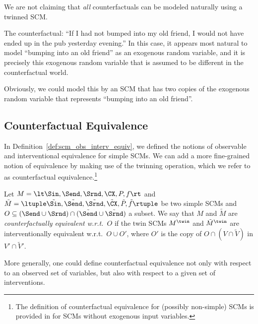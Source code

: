 We are not claiming that \emph{all} counterfactuals can be modeled naturally using a twinned SCM.
\begin{Eg}
The counterfactual: ``If I had not bumped into my old friend, I would not have ended up in the pub yesterday evening.''
In this case, it appears most natural to model ``bumping into an old friend'' as an exogenous random variable,
and it is precisely this exogenous random variable that is assumed to be different in the counterfactual world.
\end{Eg}
Obviously, we could model this by an SCM that has two copies of the exogenous random variable that represents
``bumping into an old friend''.

\subsection{Counterfactual Equivalence}

In Definition~\ref{def:scm_obs_interv_equiv}, we defined the notions of observable and interventional equivalence for simple SCMs. 
We can add a more fine-grained notion of equivalence by making use of the twinning operation, which we refer to as counterfactual equivalence.\footnote{The definition of counterfactual equivalence for (possibly non-simple) SCMs is provided in \cite{BFPM21} for SCMs without exogenous input variables.}
\begin{Def}\label{def:scm_counterfactual_equiv}
  Let $M = \lt \Sin, \Send, \Srnd, \CX, P, f \rt$ and
  $\tilde{M} = \ltuple \tilde{\Sin}, \tilde{\Send}, \tilde{\Srnd}, \tilde{\CX}, \tilde{P}, \tilde{f} \rtuple$ be two simple SCMs
  and $O \subseteq (\Send \cup \Srnd) \cap (\tilde{\Send} \cup \tilde{\Srnd})$ a subset.
  We say that $M$ and $\tilde{M}$ are \emph{counterfactually equivalent w.r.t.\ $O$} if the twin SCMs $M^\twin$ and $\tilde{M}^\twin$ are interventionally equivalent w.r.t.\ $O \cup O'$, where
    $O'$ is the copy of $O \cap (V \cap \tilde{V})$ in $V' \cap \tilde{V}'$.
\end{Def}
More generally, one could define counterfactual equivalence not only with respect to an observed set of variables, but also with respect to a given set of interventions.

